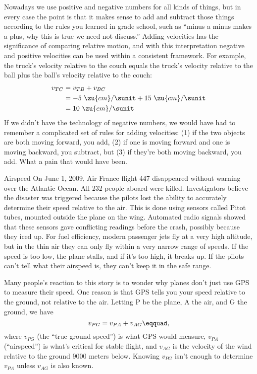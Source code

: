 Nowadays we use positive and negative numbers for all kinds
of things, but in every case the point is that it makes
sense to add and subtract those things according to the
rules you learned in grade school, such as ``minus a minus
makes a plus, why this is true we need not discuss.'' Adding
velocities has the significance of comparing relative
motion, and with this interpretation negative and positive
velocities can be used within a consistent framework. For
example, the truck's velocity relative to the couch equals
the truck's velocity relative to the ball plus the ball's
velocity relative to the couch:
\begin{align*}
     v_{TC}    &=  v_{TB}+v_{BC}      \\
         &=  -5\ \zu{cm}/\sunit + 15\ \zu{cm}/\sunit  \\
         &=  10\ \zu{cm}/\sunit
\end{align*}
If we didn't have the technology of negative numbers, we
would have had to remember a complicated set of rules for
adding velocities: (1) if the two objects are both moving
forward, you add, (2) if one is moving forward and one is
moving backward, you subtract, but (3) if they're both
moving backward, you add.  What a pain that would have been.


\begin{eg}{Airspeed}\label{eg:airspeed}
On June 1, 2009, Air France flight 447 disappeared without warning over the Atlantic Ocean.
All 232 people aboard were killed.
Investigators believe the disaster was triggered because the pilots lost the ability to
accurately determine their speed relative to the air. This is done using sensors called Pitot
tubes, mounted outside the plane on the wing. Automated radio signals showed that these sensors
gave conflicting readings before the crash, possibly because they iced up. For fuel efficiency,
modern passenger jets fly at a very high altitude, but in the thin air they
can only fly within a very narrow range of speeds. If the speed is too low, the plane stalls, and
if it's too high, it breaks up. If the pilots can't tell what their airspeed is, they can't
keep it in the safe range.

Many people's reaction to this story is to wonder why planes don't just use GPS to measure their
speed. One reason is that GPS tells you your speed relative to the ground, not relative to the
air. Letting P be the plane, A the air, and G the ground, we have
\begin{equation*}
  v_{PG} = v_{PA}+v_{AG}\eqquad,
\end{equation*}
where $v_{PG}$ (the ``true ground speed'') is what GPS would measure, $v_{PA}$ (``airspeed'')
is what's critical for stable flight, and $v_{AG}$ is the velocity of the wind relative to
the ground 9000 meters below. Knowing $v_{PG}$ isn't enough to determine $v_{PA}$ unless
$v_{AG}$ is also known.
\end{eg}

